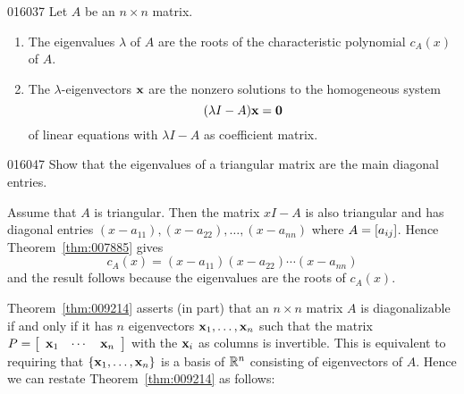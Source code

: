 \begin{theorem}{}{016037} %
Let $A$ be an $n \times n$ matrix.

\begin{enumerate}
\item The eigenvalues $\lambda$ of $A$ are the roots of the characteristic polynomial $c_{A}(x)$ of $A$.

\item The $\lambda$-eigenvectors $\textbf{x}$ are the nonzero solutions to the homogeneous system
\begin{equation*}
(\lambda I - A)\textbf{x} = \textbf{0}
\end{equation*}
of linear equations with $\lambda I - A$ as coefficient matrix.

\end{enumerate}
\end{theorem}

\begin{example}{}{016047}
Show that the eigenvalues of a triangular matrix are the main diagonal entries.

\begin{solution}
Assume that $A$ is triangular. Then the matrix $xI - A$ is also triangular and has diagonal entries $(x - a_{11}), (x - a_{22}), \dots, (x - a_{nn})$ where $A = \left[ a_{ij}\right]$. Hence Theorem~\ref{thm:007885} gives
\begin{equation*}
c_A(x) = (x - a_{11})(x - a_{22})\cdots(x - a_{nn})
\end{equation*}
and the result follows because the eigenvalues are the roots of $c_{A}(x)$.
\end{solution}
\end{example}

Theorem~\ref{thm:009214} asserts (in part) that an $n \times n$ matrix $A$ is diagonalizable if and only if it has $n$ eigenvectors $\textbf{x}_{1}, \dots, \textbf{x}_{n}$ such that the matrix $P = 
\left[ \begin{array}{ccc}
\textbf{x}_{1} & \cdots & \textbf{x}_{n}
\end{array} \right]
$ with the $\textbf{x}_{i}$ as columns is invertible. This is equivalent to requiring that $\{\textbf{x}_{1}, \dots, \textbf{x}_{n}\}$ is a basis of $\mathbb{R}^n$ consisting of eigenvectors of $A$. Hence we can restate Theorem~\ref{thm:009214} as follows:


